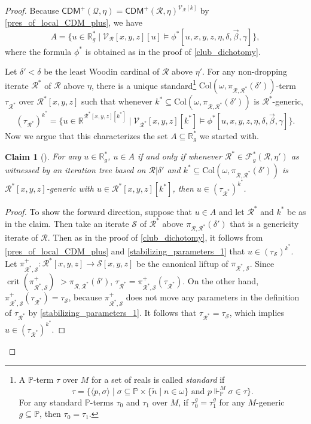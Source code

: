 \documentclass{amsart}
\newtheorem{claim}{Claim}[dfn]
\renewcommand{\subset}{\subseteq}
\DeclareMathOperator{\crit}{crit}
\begin{document}
\begin{proof}
Because $\mathsf{CDM}^+(\mathcal{Q}, \eta)=\mathsf{CDM}^+(\mathcal{R}, \eta)^{\mathcal{V}_{\mathcal{R}}[k]}$ by \cref{pres_of_local_CDM_plus}, we have
\[
A=\{u\in\mathbb{R}^*_g\mid\mathcal{V}_{\mathcal{R}}[x, y, z][u]\models\phi^*[u, x, y, z, \eta, \delta, \vec{\beta}, \gamma]\},
\]
where the formula $\phi^*$ is obtained as in the proof of \cref{club_dichotomy}.

Let $\delta'<\delta$ be the least Woodin cardinal of $\mathcal{R}$ above $\eta'$.
For any non-dropping iterate $\mathcal{R}^*$ of $\mathcal{R}$ above $\eta$, there is a unique standard\footnote{A $\mathbb{P}$-term $\tau$ over $M$ for a set of reals is called \emph{standard} if
\[
\tau=\{\langle p, \sigma\rangle\mid \sigma\subset\mathbb{P}\times\{\check{n}\mid n\in\omega\}\text{ and }p\Vdash^{M}_{\mathbb{P}}\sigma\in\tau\}.
\]
For any standard $\mathbb{P}$-terms $\tau_0$ and $\tau_1$ over $M$, if $\tau_0^{g}=\tau_1^{g}$ for any $M$-generic $g\subset\mathbb{P}$, then $\tau_0=\tau_1$.} $\mathrm{Col}(\omega, \pi_{\mathcal{R}, \mathcal{R}^*}(\delta'))$-term $\tau_{\mathcal{R}^*}$ over $\mathcal{R}^*[x, y, z]$ such that whenever $k^*\subset\mathrm{Col}(\omega, \pi_{\mathcal{R}, \mathcal{R}^*}(\delta'))$ is $\mathcal{R}^*$-generic,
\[
(\tau_{\mathcal{R}^*})^{k^*}=\{u\in\mathbb{R}^{\mathcal{R}^*[x, y, z][k^*]}\mid\mathcal{V}_{\mathcal{R}^*}[x, y, z][k^*]\models\phi^*[u, x, y, z, \eta, \delta, \vec{\beta}, \gamma]\}.
\]
Now we argue that this characterizes the set $A\subset\mathbb{R}^*_g$ we started with.

\begin{claim}[{\cite[Lemma 4.4]{CoveringChang}}]\label{projective_def_of_A}
For any $u\in\mathbb{R}^*_g$, $u\in A$ if and only if whenever $\mathcal{R}^*\in\mathcal{F}^*_g(\mathcal{R}, \eta')$ as witnessed by an iteration tree based on $\mathcal{R}\vert\delta'$ and $k^*\subset\mathrm{Col}(\omega, \pi_{\mathcal{R}, \mathcal{R}^*}(\delta'))$ is $\mathcal{R}^*[x, y, z]$-generic with $u\in\mathcal{R}^*[x, y, z][k^*]$, then $u\in (\tau_{\mathcal{R}^*})^{k^*}$.
\end{claim}
\begin{proof}
To show the forward direction, suppose that $u\in A$ and let $\mathcal{R}^*$ and $k^*$ be as in the claim.
Then take an iterate $\mathcal{S}$ of $\mathcal{R}^*$ above $\pi_{\mathcal{R}, \mathcal{R}^*}(\delta')$ that is a genericity iterate of $\mathcal{R}$.
Then as in the proof of \cref{club_dichotomy}, it follows from \cref{pres_of_local_CDM_plus} and \cref{stabilizing_parameters_1} that $u\in (\tau_{\mathcal{S}})^{k^*}$.
Let $\pi_{\mathcal{R}^*, \mathcal{S}}^{+}\colon\mathcal{R}^*[x, y, z]\to\mathcal{S}[x, y, z]$ be the canonical liftup of $\pi_{\mathcal{R}^*, \mathcal{S}}$.
Since $\crit(\pi_{\mathcal{R}^*, \mathcal{S}}^{+})$ $>\pi_{\mathcal{R}, \mathcal{R}^*}(\delta')$, $\tau_{\mathcal{R}^*}=\pi_{\mathcal{R}^*, \mathcal{S}}^{+}(\tau_{\mathcal{R}^*})$.
On the other hand, $\pi_{\mathcal{R}^*, \mathcal{S}}^{+}(\tau_{\mathcal{R}^*})=\tau_{\mathcal{S}}$, because $\pi_{\mathcal{R}^*, \mathcal{S}}^+$ does not move any parameters in the definition of $\tau_{\mathcal{R}^*}$ by \cref{stabilizing_parameters_1}.
It follows that $\tau_{\mathcal{R}^*} = \tau_{\mathcal{S}}$, which implies $u\in(\tau_{\mathcal{R}^*})^{k^*}$.


\end{proof}
\end{proof}
\end{document}
